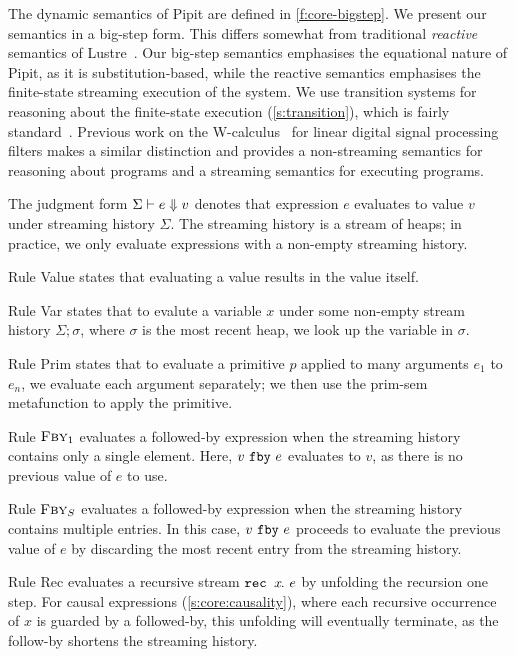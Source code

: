 The dynamic semantics of Pipit are defined in \autoref{f:core-bigstep}.
We present our semantics in a big-step form.
This differs somewhat from traditional \emph{reactive} semantics of Lustre~\cite{caspi1995functional}.
Our big-step semantics emphasises the equational nature of Pipit, as it is substitution-based, while the reactive semantics emphasises the finite-state streaming execution of the system.
We use transition systems for reasoning about the finite-state execution (\autoref{s:transition}), which is fairly standard~\cite{brun2023equation,champion2016kind2,raymond2008synchronous}.
Previous work on the {\sc W-calculus}~\cite{gallego2021w} for linear digital signal processing filters makes a similar distinction and provides a non-streaming semantics for reasoning about programs and a streaming semantics for executing programs.


The judgment form $\Sigma \vdash e \Downarrow v$ denotes that expression $e$ evaluates to value $v$ under streaming history $\Sigma$.
The streaming history is a stream of heaps; in practice, we only evaluate expressions with a non-empty streaming history.

Rule {\sc Value} states that evaluating a value results in the value itself.

Rule {\sc Var} states that to evalute a variable $x$ under some non-empty stream history $\Sigma; \sigma$, where $\sigma$ is the most recent heap, we look up the variable in $\sigma$.

Rule {\sc Prim} states that to evaluate a primitive $p$ applied to many arguments $e_1$ to $e_n$, we evaluate each argument separately; we then use the prim-sem metafunction to apply the primitive.

Rule $\textsc{Fby}_1$ evaluates a followed-by expression when the streaming history contains only a single element.
Here, $v~\texttt{fby}~e$ evaluates to $v$, as there is no previous value of $e$ to use.

Rule $\textsc{Fby}_S$ evaluates a followed-by expression when the streaming history contains multiple entries.
In this case, $v~\texttt{fby}~e$ proceeds to evaluate the previous value of $e$ by discarding the most recent entry from the streaming history.

Rule {\sc Rec} evaluates a recursive stream $\texttt{rec~} x\hspace{-0.1em}.~e$ by unfolding the recursion one step.
For causal expressions (\autoref{s:core:causality}), where each recursive occurrence of $x$ is guarded by a followed-by, this unfolding will eventually terminate, as the follow-by shortens the streaming history.

